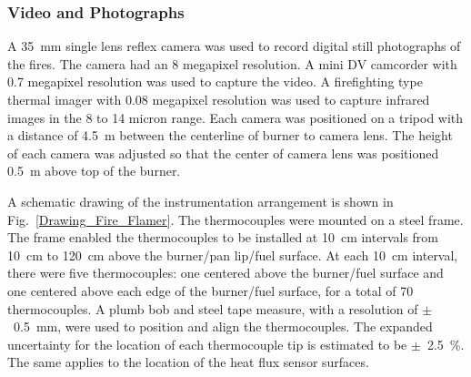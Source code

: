 \documentclass[twoside]{uocthesis}
\begin{document}
{\subsubsection{Video and Photographs}

A 35~mm single lens reflex camera was used to record digital still photographs of the fires.  The camera had an 8 megapixel resolution.  A mini DV camcorder with 0.7 megapixel resolution was used to capture the video.  A firefighting type thermal imager with 0.08 megapixel resolution was used to capture infrared images in the 8 to 14 micron range.  Each camera was positioned on a tripod with a distance of 4.5~m between the centerline of burner to camera lens.  The height of each camera was adjusted so that the center of camera lens was positioned 0.5~m above top of the burner.

A schematic drawing of the instrumentation arrangement is shown in Fig.~\ref{Drawing_Fire_Flamer}.  The thermocouples were mounted on a steel frame.  The frame enabled the thermocouples to be installed at 10~cm intervals from 10~cm to 120~cm above the burner/pan lip/fuel surface. At each 10~cm interval, there were five thermocouples: one centered above the burner/fuel surface and one centered above each edge of the burner/fuel surface, for a total of 70 thermocouples.  A plumb bob and steel tape measure, with a resolution of $\pm$~0.5~mm, were used to position and align the thermocouples.   The expanded uncertainty for the location of each thermocouple tip is estimated to be $\pm$~2.5~\%.  The same applies to the location of the heat flux sensor surfaces.

}
\end{document}
